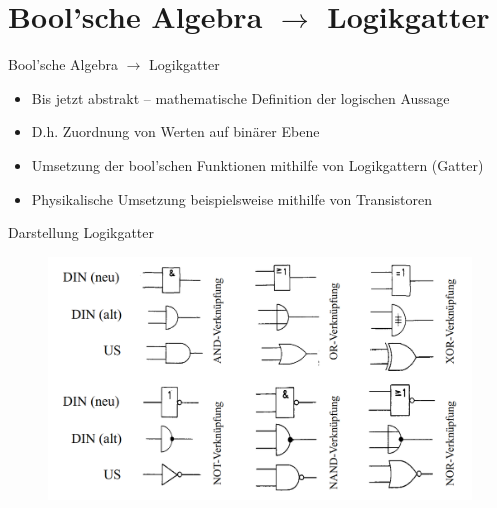 \documentclass[12pt%
,aspectratio=169%
]{beamer}
\begin{document}
\section{Bool'sche Algebra $\to$ Logikgatter}
\begin{frame}{Bool'sche Algebra $\to$ Logikgatter}
\begin{itemize}
	\item Bis jetzt abstrakt -- mathematische Definition der logischen Aussage
	\item D.h. Zuordnung von Werten auf binärer Ebene
	\item Umsetzung der bool'schen Funktionen mithilfe von Logikgattern (Gatter)	
	\item Physikalische Umsetzung beispielsweise mithilfe von Transistoren
\end{itemize}
\end{frame}

\begin{frame}{Darstellung Logikgatter}
\begin{figure}
\center
\includegraphics[scale=0.25]{pictures/logikgatter}
\end{figure}
\end{frame}
\end{document}
